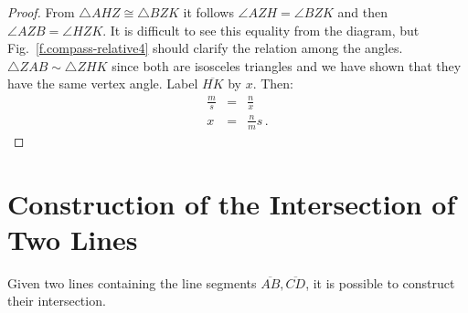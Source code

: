 \begin{proof}
From $\triangle AHZ\cong\triangle BZK$ it follows $\angle AZH = \angle BZK$ and then $\angle AZB = \angle HZK$. It is difficult to see this equality from the diagram, but Fig.~\ref{f.compass-relative4} should clarify the relation among the angles. $\triangle ZAB\sim\triangle ZHK$ since both are isosceles triangles and we have shown that they have the same vertex angle. Label $\overline{HK}$ by $x$. Then:
\begin{eqnarray*}
\frac{m}{s} &=& \frac{n}{x}\\
x&=&\frac{n}{m}s\,.
\end{eqnarray*}

\end{proof}



\section{Construction of the Intersection of Two Lines}\label{s.two-lines}

\begin{theorem}
Given two lines containing the line segments $\overline{AB}, \overline{CD}$, it is possible to construct their intersection.
\end{theorem}

